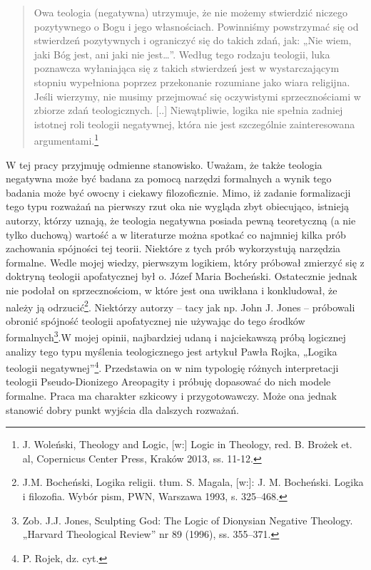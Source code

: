 \begin{quote}
    Owa teologia (negatywna) utrzymuje, że nie możemy stwierdzić niczego
pozytywnego o Bogu i jego własnościach. Powinniśmy powstrzymać się od
stwierdzeń pozytywnych i ograniczyć się do takich zdań, jak: „Nie wiem,
jaki Bóg jest, ani jaki nie jest…”. Według tego rodzaju teologii, luka
poznawcza wyłaniająca się z takich stwierdzeń jest w wystarczającym
stopniu wypełniona poprzez przekonanie rozumiane jako wiara religijna.
Jeśli wierzymy, nie musimy przejmować się oczywistymi sprzecznościami w
zbiorze zdań teologicznych. [..] Niewątpliwie, logika nie spełnia
zadniej istotnej roli teologii negatywnej, która nie jest szczególnie
zainteresowana argumentami.\footnote{J. Woleński, Theology and Logic,
[w:] Logic in Theology, red. B. Brożek et. al, Copernicus Center Press,
Kraków 2013, ss. 11-12.}
\end{quote}




W tej pracy przyjmuję odmienne stanowisko. Uważam, że także teologia
negatywna może być badana za pomocą narzędzi formalnych a wynik tego
badania może być owocny i ciekawy filozoficznie. Mimo, iż zadanie
formalizacji tego typu rozważań na pierwszy rzut oka nie wygląda zbyt
obiecująco, istnieją autorzy, którzy uznają, że teologia negatywna
posiada pewną teoretyczną (a nie tylko duchową) wartość a w literaturze
można spotkać co najmniej kilka prób zachowania spójności tej teorii.
Niektóre z tych prób wykorzystują narzędzia formalne. Wedle mojej
wiedzy, pierwszym logikiem, który próbował zmierzyć się z doktryną
teologii apofatycznej był o. Józef Maria Bocheński. Ostatecznie jednak
nie podołał on sprzecznościom, w które jest ona uwikłana i konkludował,
że należy ją odrzucić\footnote{J.M. Bocheński, Logika religii. tłum. S.
Magala, [w:]: J. M. Bocheński. Logika i filozofia. Wybór pism, PWN,
Warszawa 1993, s. 325--468. }. Niektórzy autorzy -- tacy jak np.
John J. Jones -- próbowali obronić spójność teologii apofatycznej nie
używając do tego środków formalnych\footnote{Zob. J.J. Jones, Sculpting
God: The Logic of Dionysian Negative Theology. „Harvard Theological
Review” nr 89 (1996), ss. 355–371. }.W mojej opinii, najbardziej
udaną i najciekawszą próbą logicznej analizy tego typu myślenia
teologicznego jest artykuł Pawła Rojka, „Logika teologii
negatywnej”\footnote{P. Rojek, dz. cyt. }. Przedstawia on w nim
typologię różnych interpretacji teologii Pseudo-Dionizego Areopagity i
próbuję dopasować do nich modele formalne. Praca ma charakter szkicowy
i przygotowawczy. Może ona jednak stanowić dobry punkt wyjścia dla
dalszych rozważań.


